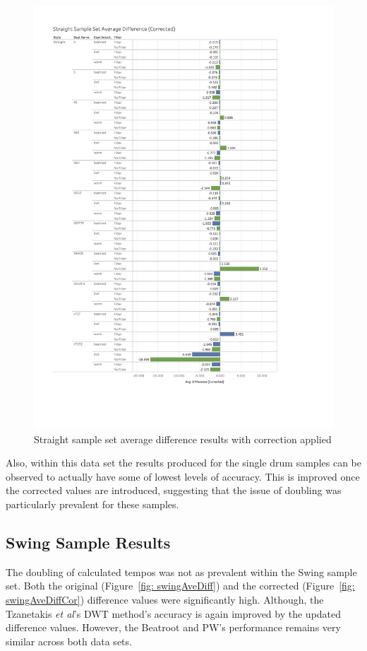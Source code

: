 \documentclass[a4paper, 11pt]{article}
\begin{document}
\begin{figure}[htbp]
\centering
\includegraphics[scale=0.38]{images/SSSADC.jpg}
\caption{Straight sample set average difference results with correction applied}
\label{fig: stradAveDiffCor}
\end{figure}

Also, within this data set the results produced for the single drum samples can be observed to actually have some of lowest levels of accuracy. This is improved once the corrected values are introduced, suggesting that the issue of doubling was particularly prevalent for these samples. 

\subsection{Swing Sample Results}
The doubling of calculated tempos was not as prevalent within the Swing sample set. Both the original (Figure~\ref{fig: swingAveDiff}) and the corrected (Figure~\ref{fig: swingAveDiffCor}) difference values were significantly high. Although, the Tzanetakis \textit{et al}'s \cite{tzane1} DWT method's accuracy is again improved by the updated difference values. However, the Beatroot and PW's performance remains very similar across both data sets.
\end{document}
